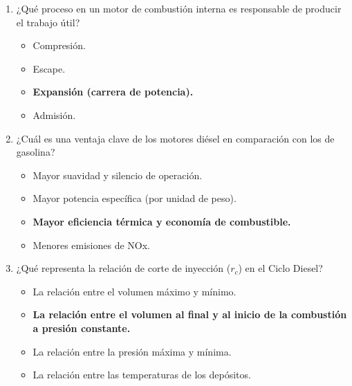 \documentclass{article}
\begin{document}
\begin{enumerate}[label=\arabic*.]
    \item ¿Qué proceso en un motor de combustión interna es responsable de producir el trabajo útil?
    \begin{itemize}[label=\alph*)]
        \item Compresión.
        \item Escape.
        \item \textbf{Expansión (carrera de potencia).}
        \item Admisión.
    \end{itemize}

    \item ¿Cuál es una ventaja clave de los motores diésel en comparación con los de gasolina?
    \begin{itemize}[label=\alph*)]
        \item Mayor suavidad y silencio de operación.
        \item Mayor potencia específica (por unidad de peso).
        \item \textbf{Mayor eficiencia térmica y economía de combustible.}
        \item Menores emisiones de NOx.
    \end{itemize}

    \item ¿Qué representa la relación de corte de inyección ($r_c$) en el Ciclo Diesel?
    \begin{itemize}[label=\alph*)]
        \item La relación entre el volumen máximo y mínimo.
        \item \textbf{La relación entre el volumen al final y al inicio de la combustión a presión constante.}
        \item La relación entre la presión máxima y mínima.
        \item La relación entre las temperaturas de los depósitos.
    \end{itemize}

\end{enumerate}
\end{document}
